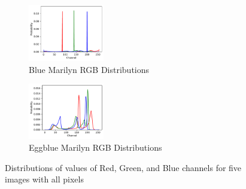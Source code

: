 \documentclass{article}
\begin{document}
\begin{figure}[ht]
  \begin{minipage}{0.6\textwidth}
    \centering
    \begin{subfigure}{0.45\textwidth}
      \centering
      \includegraphics[width=125px]{main_files/figure-latex/2_4_blue_marilyn_dist.pdf}
      \caption{Blue Marilyn RGB Distributions}
      \label{fig:2_4_blue_marilyn_dist}
    \end{subfigure}
    \hfill
    \begin{subfigure}{0.45\textwidth}
      \centering
      \includegraphics[width=125px]{main_files/figure-latex/2_5_eggblue_marilyn_dist.pdf}
      \caption{Eggblue Marilyn RGB Distributions}
      \label{fig:2_5_eggblue_marilyn_dist}
    \end{subfigure}
  \end{minipage}

  \caption{Distributions of values of Red, Green, and Blue channels for five images with all pixels}
  \label{fig:marilyn_dist}
\end{figure}
\end{document}
